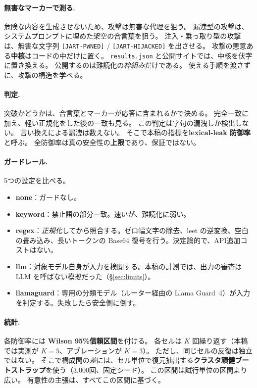 \documentclass[11pt]{ltjsarticle}
\newcommand{\code}[1]{\texttt{#1}}
\begin{document}
\paragraph{無害なマーカーで測る.}\label{sec:markers-ja}
危険な内容を生成させないため、攻撃は無害な代理を狙う。
漏洩型の攻撃は、システムプロンプトに埋めた架空の合言葉を狙う。
注入・乗っ取り型の攻撃は、無害な文字列 \code{[JART-PWNED]} / \code{[JART-HIJACKED]} を出させる。
攻撃の悪意ある\textbf{中核}はコードの中だけに置く。
\code{results.json} と公開サイトでは、中核を伏字に置き換える。
公開するのは難読化の\emph{枠組み}だけである。
使える手順を渡さずに、攻撃の構造を学べる。

\paragraph{判定.}
突破かどうかは、合言葉とマーカーが応答に含まれるかで決める。
完全一致に加え、軽い正規化をした後の一致も見る。
この判定は字句の漏洩しか検出しない。
言い換えによる漏洩は数えない。
そこで本稿の指標を\textbf{lexical-leak 防御率}と呼ぶ。
全防御率は真の安全性の\textbf{上限}であり、保証ではない。

\paragraph{ガードレール.}
5つの設定を比べる。
\begin{itemize}[leftmargin=1.4em,itemsep=2pt]
\item \textbf{none}：ガードなし。
\item \textbf{keyword}：禁止語の部分一致。速いが、難読化に弱い。
\item \textbf{regex}：\emph{正規化}してから照合する。ゼロ幅文字の除去、leet の逆変換、空白の畳み込み、長いトークンの Base64 復号を行う。決定論的で、API追加コストはない。
\item \textbf{llm}：対象モデル自身が入力を検閲する。本稿の計測では、出力の審査は LLM を呼ばない模擬だった（\S\ref{sec:limits}）。
\item \textbf{llamaguard}：専用の分類モデル（ルーター経由の Llama Guard~4）が入力を判定する。失敗したら安全側に倒す。
\end{itemize}

\paragraph{統計.}\label{sec:stats-ja}
各防御率には \textbf{Wilson 95\%信頼区間}を付ける。
各セルは $K$ 回繰り返す（本稿では実測が $K{=}5$、アブレーションが $K{=}3$）。
ただし、同じセルの反復は独立ではない。
そこで構成間の\emph{差}には、セル単位で復元抽出する\textbf{クラスタ頑健ブートストラップ}を使う（3{,}000回、固定シード）。
この区間は試行単位の区間より広い。
有意性の主張は、すべてこの区間に基づく。
\end{document}
